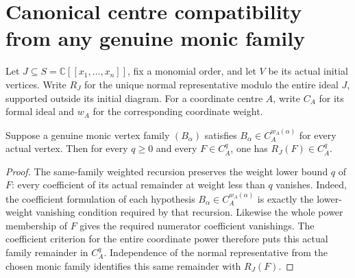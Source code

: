 \section{Canonical centre compatibility from any genuine monic family}

Let $J\subseteq S=\mathbb C[[x_1,\ldots,x_n]]$, fix a monomial order,
and let $V$ be its actual initial vertices. Write $R_J$ for the unique
normal representative modulo the entire ideal $J$, supported outside its
initial diagram. For a coordinate centre $A$, write $C_A$ for its formal
ideal and $w_A$ for the corresponding coordinate weight.

\begin{lemma}
\label{hir:actual-canonical-remainder-centre-power-from-family}
\leanok
Suppose a genuine monic vertex family $(B_\alpha)$ satisfies
$B_\alpha\in C_A^{w_A(\alpha)}$ for every actual vertex. Then for every
$q\geq0$ and every $F\in C_A^q$, one has $R_J(F)\in C_A^q$.
\end{lemma}
\begin{proof}
The same-family weighted recursion preserves the weight lower bound $q$
of $F$: every coefficient of its actual remainder at weight less than $q$
vanishes. Indeed, the coefficient formulation of each hypothesis
$B_\alpha\in C_A^{w_A(\alpha)}$ is exactly the lower-weight vanishing
condition required by that recursion. Likewise the whole power membership
of $F$ gives the required numerator coefficient vanishings. The coefficient
criterion for the entire coordinate power therefore puts this actual family
remainder in $C_A^q$. Independence of the normal representative from the
chosen monic family identifies this same remainder with $R_J(F)$.
\end{proof}

